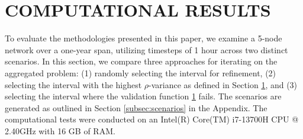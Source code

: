 

\section{COMPUTATIONAL RESULTS}

To evaluate the methodologies presented in this paper, we examine a  5-node network over a one-year span, utilizing timesteps of 1 hour across two distinct scenarios.
 In this section, we compare three approaches for iterating on the aggregated problem: (1) randomly selecting the interval for refinement, 
 (2) selecting the interval with the highest \(\rho\)-variance as defined in Section \ref{}, and (3) selecting the interval where the validation function \ref{} fails. 
 The scenarios are generated as outlined in Section \ref{subsec:scenarios} in the Appendix. 
 The computational tests were conducted on an Intel(R) Core(TM) i7-13700H CPU @ 2.40GHz with 16 GB of RAM.

